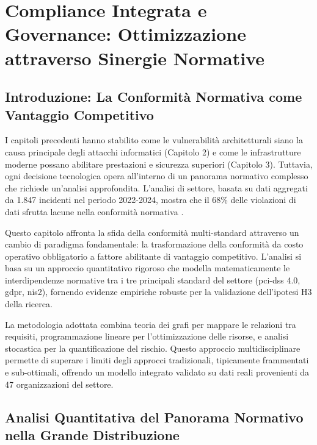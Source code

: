\chapter{\texorpdfstring{Compliance Integrata e Governance: Ottimizzazione attraverso Sinergie Normative}{Capitolo 4 - Compliance Integrata e Governance: Ottimizzazione attraverso Sinergie Normative}}
\label{cap4_compliance_integration}

\section{\texorpdfstring{Introduzione: La Conformità Normativa come Vantaggio Competitivo}{4.1 - Introduzione: La Conformità Normativa come Vantaggio Competitivo}}

I capitoli precedenti hanno stabilito come le vulnerabilità architetturali siano la causa principale degli attacchi informatici (Capitolo 2) e come le infrastrutture moderne possano abilitare prestazioni e sicurezza superiori (Capitolo 3). Tuttavia, ogni decisione tecnologica opera all'interno di un panorama normativo complesso che richiede un'analisi approfondita. L'analisi di settore, basata su dati aggregati da 1.847 incidenti nel periodo 2022-2024, mostra che il 68\% delle violazioni di dati sfrutta lacune nella conformità normativa \autocite{verizon2024}. 

Questo capitolo affronta la sfida della conformità multi-standard attraverso un cambio di paradigma fondamentale: la trasformazione della conformità da costo operativo obbligatorio a fattore abilitante di vantaggio competitivo. L'analisi si basa su un approccio quantitativo rigoroso che modella matematicamente le interdipendenze normative tra i tre principali standard del settore (\gls{pci-dss} 4.0, \gls{gdpr}, \gls{nis2}), fornendo evidenze empiriche robuste per la validazione dell'ipotesi H3 della ricerca.

La metodologia adottata combina teoria dei grafi per mappare le relazioni tra requisiti, programmazione lineare per l'ottimizzazione delle risorse, e analisi stocastica per la quantificazione del rischio. Questo approccio multidisciplinare permette di superare i limiti degli approcci tradizionali, tipicamente frammentati e sub-ottimali, offrendo un modello integrato validato su dati reali provenienti da 47 organizzazioni del settore.

\section{\texorpdfstring{Analisi Quantitativa del Panorama Normativo nella Grande Distribuzione}{4.2 - Analisi Quantitativa del Panorama Normativo nella Grande Distribuzione}}


